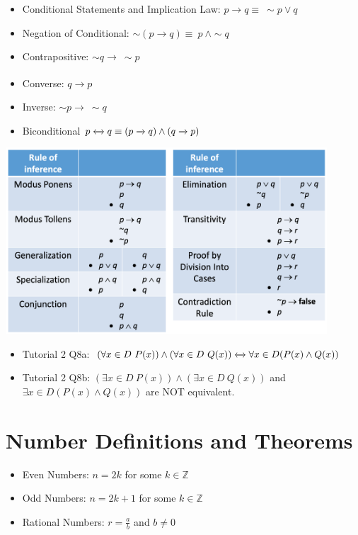 \documentclass{article}
\begin{document}
\begin{itemize}
    \item Conditional Statements and Implication Law: $p\xrightarrow{} q \equiv \ \sim p \vee q$
    \item Negation of Conditional: $\sim (p\xrightarrow{} q) \equiv \ p \  \land \sim q$
    \item Contrapositive: $\sim q \xrightarrow[]{} \ \sim p$
    \item Converse: $q \xrightarrow{} p$
    \item Inverse: $\sim p \xrightarrow{} \ \sim q$
    \item Biconditional $p \xleftrightarrow{} q \equiv (p \xrightarrow{} q) \wedge (q\xrightarrow{}p)$
\end{itemize}
\begin{center}
    \includegraphics[width=12cm]{images/rulesofinference.png}
\begin{itemize}
    \item Tutorial 2 Q8a: $(\forall x \in D \ P(x))\land(\forall x \in D \ Q(x)) \xleftrightarrow{} \forall x \in D (P(x) \land Q(x))$
    \item Tutorial 2 Q8b: $(\exists x \in D \ P(x)) \land (\exists x \in D \ Q(x))$ and $\exists x \in D (P(x) \land Q(x))$ are NOT equivalent.
\end{itemize}
\end{center}

\section*{Number Definitions and Theorems}
\begin{multicols}{2}
    \begin{itemize}
        \item Even Numbers: $n=2k$ for some $k \in \mathbb{Z}$
        \item Odd Numbers: $n=2k+1$ for some $k \in\mathbb{Z}$
        \item Rational Numbers: $r=\frac{a}{b}$ and $b\neq0$
    \end{itemize}
\end{multicols}
\end{document}
